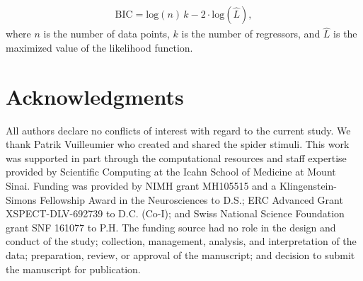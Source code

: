 \documentclass[12pt]{article}
\begin{document}
\begin{equation}
\begin{aligned}
\text{BIC} = \text{log}(n)\,k - 2 \cdot \text{log}(\hat{L}),
\end{aligned}
\end{equation}
where \(n\) is the number of data points, \(k\) is the number of regressors,
and \(\hat{L}\) is the maximized value of the likelihood function.

\section*{Acknowledgments}
\label{sec:org5121e1f}
All authors declare no conflicts of interest with regard to the current
study. We thank Patrik Vuilleumier who created and shared the spider
stimuli. This work was supported in part through the computational
resources and staff expertise provided by Scientific Computing at the
Icahn School of Medicine at Mount Sinai.  Funding was provided by NIMH
grant MH105515 and a Klingenstein-Simons Fellowship Award in the
Neurosciences to D.S.; ERC Advanced Grant XSPECT-DLV-692739 to D.C.
(Co-I); and Swiss National Science Foundation grant SNF 161077 to
P.H. The funding source had no role in the design and conduct of the
study; collection, management, analysis, and interpretation of the data;
preparation, review, or approval of the manuscript; and decision to
submit the manuscript for publication.

\clearpage




\clearpage
\singlespace
\end{document}
